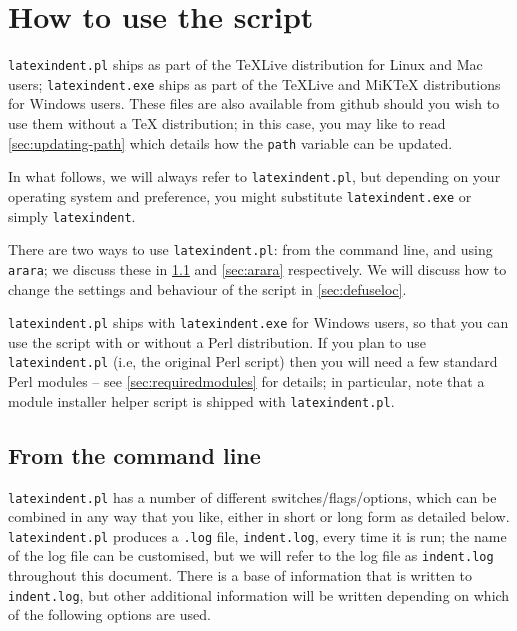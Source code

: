 \section{How to use the script}
 \texttt{latexindent.pl} ships as part of the \TeX Live distribution for
 Linux and Mac users; \texttt{latexindent.exe} ships as part of the \TeX Live and
 MiK\TeX{} distributions for Windows users. These files are also available from github
 \cite{latexindent-home} should you wish to use them without a \TeX{} distribution; in
 this case, you may like to read \vref{sec:updating-path} which details how the
 \texttt{path} variable can be updated.

 In what follows, we will always refer to \texttt{latexindent.pl}, but depending on your
 operating system and preference, you might substitute \texttt{latexindent.exe} or simply
 \texttt{latexindent}.

 There are two ways to use \texttt{latexindent.pl}: from the command line, and using
 \texttt{arara}; we discuss these in \cref{sec:commandline} and \cref{sec:arara}
 respectively. We will discuss how to change the settings and behaviour of the script in
 \vref{sec:defuseloc}.

 \texttt{latexindent.pl} ships with \texttt{latexindent.exe} for Windows
 users, so that you can use the script with or without a Perl distribution. If you plan to
 use \texttt{latexindent.pl} (i.e, the original Perl script) then you will need a few
 standard Perl modules -- see \vref{sec:requiredmodules} for
 details;%
  in particular, note that a module installer helper script is shipped with
 \texttt{latexindent.pl}.

\subsection{From the command line}\label{sec:commandline}
	\texttt{latexindent.pl} has a number of different switches/flags/options, which
	can be combined in any way that you like, either in short or long form as detailed below.
	\texttt{latexindent.pl} produces a \texttt{.log} file, \texttt{indent.log}, every time it
	is run; the name of the log file can be customised, but we will refer to the log file as
	\texttt{indent.log} throughout this document. There is a base of information that is
	written to \texttt{indent.log}, but other additional information will be written
	depending on which of the following options are used.


